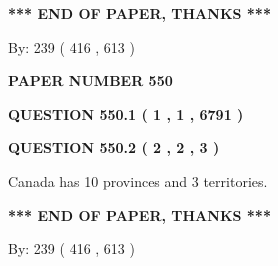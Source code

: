 \documentclass[12pt]{article}
\begin{document}
   
   
\vspace{1.0in} 
{\textbf{\large{ *** END OF PAPER, THANKS *** }}} 
   
   
\hspace{1.0in} By: 
 239 ( 416 ,  613 )
   
   
   
   
\newpage 
\setcounter{page}{ 
   550001 } 
   
   
   
   
 {\textbf{ \Large{ PAPER NUMBER  550  }}}
   
   
\vspace{0.2in}
   
   
   
   
   
   
 \vspace{0.2in}
 
 
 
 
   
   
  
\vspace{0.2in}
  
{\textbf{\Large{QUESTION
550.1 
 ( 1 , 1 , 6791 )
}}}
  
  
  
\vspace{0.2in}
  
{\textbf{\Large{QUESTION
550.2 
 ( 2 , 2 , 3 )
}}}
  
  
 
 
\noindent{}
 
 
Canada has 10  provinces and 3 territories.
 
 
 
 
   
   
 \vspace{0.2in}
 
   
   
   
   
\vspace{1.0in} 
{\textbf{\large{ *** END OF PAPER, THANKS *** }}} 
   
   
\hspace{1.0in} By: 
 239 ( 416 ,  613 )
   
   
   
   
\newpage 
\setcounter{page}{ 
   551001 } 
   
\end{document}
